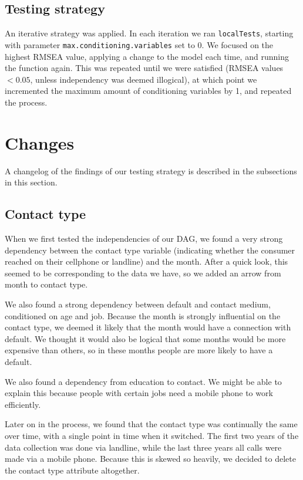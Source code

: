 \documentclass[11pt]{article}
\begin{document}
\begin{multicols}{2}
\newpage
\subsection{Testing strategy}
An iterative strategy was applied. In each iteration we ran \texttt{localTests}, starting with parameter \texttt{max.conditioning.variables} set to 0. We focused on the highest RMSEA value, applying a change to the model each time, and running the function again. This was repeated until we were satisfied (RMSEA values $<0.05$, unless independency was deemed illogical), at which point we incremented the maximum amount of conditioning variables by 1, and repeated the process.

\section{Changes}
A changelog of the findings of our testing strategy is described in the subsections in this section. 

\subsection{Contact type}
When we first tested the independencies of our DAG, we found a very strong
dependency between the contact type variable (indicating whether the consumer
reached on their cellphone or landline) and the month. After a quick look, this
seemed to be corresponding to the data we have, so we added an arrow from month
to contact type. 

We also found a strong dependency between default and contact medium,
conditioned on age and job. Because the month is strongly influential on the
contact type, we deemed it likely that the month would have a connection with
default. We thought it would also be logical that some months would be more
expensive than others, so in these months people are more likely to have a
default. 

We also found a dependency from education to contact. We might be able to
explain this because people with certain jobs need a mobile phone to work
efficiently. 

Later on in the process, we found that the contact type was
continually the same over time, with a single point in time when it switched. The first two years of the data collection was done
via landline, while the last three years all calls were made via a mobile phone.
Because this is skewed so heavily, we decided to delete the contact type attribute altogether. 


\end{multicols}
\end{document}
